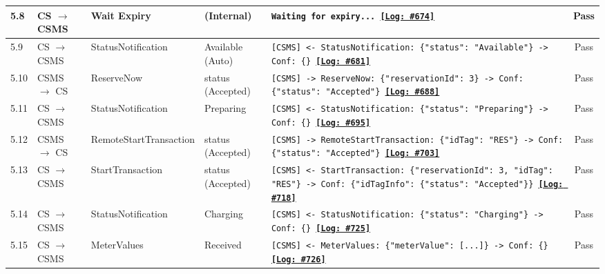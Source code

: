 \documentclass[10pt, a4paper, landscape]{article}
\begin{document}
\begin{longtable}{|p{1.0cm}|p{2.5cm}|p{4.0cm}|p{5.0cm}|p{10.0cm}|c|}
\hline
5.8 & CS $\to$ CSMS & Wait Expiry & (Internal) & \footnotesize\texttt{Waiting for expiry... \newline \hyperref[log:5.8]{\textbf{[Log: \#674]}}} & Pass \\
\hline
5.9 & CS $\to$ CSMS & StatusNotification & Available (Auto) & \footnotesize\texttt{[CSMS] <- StatusNotification: \{"status": "Available"\} \newline [CSMS] -> Conf: \{\} \newline \hyperref[log:5.9]{\textbf{[Log: \#681]}}} & Pass \\
\hline
5.10 & CSMS $\to$ CS & ReserveNow & status (Accepted) & \footnotesize\texttt{[CSMS] -> ReserveNow: \{"reservationId": 3\} \newline [CS] -> Conf: \{"status": "Accepted"\} \newline \hyperref[log:5.10]{\textbf{[Log: \#688]}}} & Pass \\
\hline
5.11 & CS $\to$ CSMS & StatusNotification & Preparing & \footnotesize\texttt{[CSMS] <- StatusNotification: \{"status": "Preparing"\} \newline [CSMS] -> Conf: \{\} \newline \hyperref[log:5.11]{\textbf{[Log: \#695]}}} & Pass \\
\hline
5.12 & CSMS $\to$ CS & RemoteStartTransaction & status (Accepted) & \footnotesize\texttt{[CSMS] -> RemoteStartTransaction: \{"idTag": "RES"\} \newline [CS] -> Conf: \{"status": "Accepted"\} \newline \hyperref[log:5.12]{\textbf{[Log: \#703]}}} & Pass \\
\hline
5.13 & CS $\to$ CSMS & StartTransaction & status (Accepted) & \footnotesize\texttt{[CSMS] <- StartTransaction: \{"reservationId": 3, "idTag": "RES"\} \newline [CSMS] -> Conf: \{"idTagInfo": \{"status": "Accepted"\}\} \newline \hyperref[log:5.13]{\textbf{[Log: \#718]}}} & Pass \\
\hline
5.14 & CS $\to$ CSMS & StatusNotification & Charging & \footnotesize\texttt{[CSMS] <- StatusNotification: \{"status": "Charging"\} \newline [CSMS] -> Conf: \{\} \newline \hyperref[log:5.14]{\textbf{[Log: \#725]}}} & Pass \\
\hline
5.15 & CS $\to$ CSMS & MeterValues & Received & \footnotesize\texttt{[CSMS] <- MeterValues: \{"meterValue": [...]\} \newline [CSMS] -> Conf: \{\} \newline \hyperref[log:5.15]{\textbf{[Log: \#726]}}} & Pass \\

\end{longtable}
\end{document}

